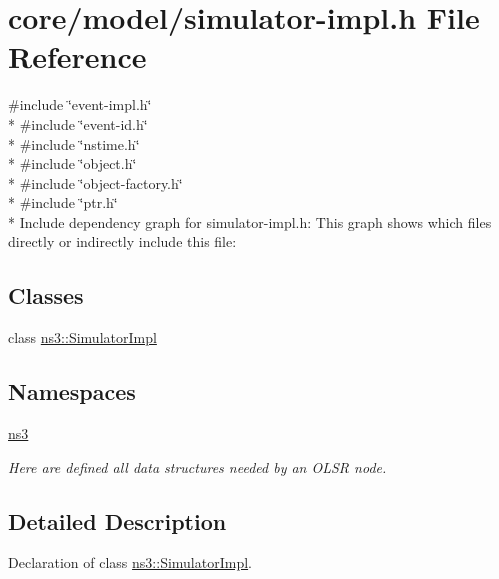 \hypertarget{simulator-impl_8h}{}\section{core/model/simulator-\/impl.h File Reference}
\label{simulator-impl_8h}
{\ttfamily \#include \char`\"{}event-\/impl.\+h\char`\"{}}\\*
{\ttfamily \#include \char`\"{}event-\/id.\+h\char`\"{}}\\*
{\ttfamily \#include \char`\"{}nstime.\+h\char`\"{}}\\*
{\ttfamily \#include \char`\"{}object.\+h\char`\"{}}\\*
{\ttfamily \#include \char`\"{}object-\/factory.\+h\char`\"{}}\\*
{\ttfamily \#include \char`\"{}ptr.\+h\char`\"{}}\\*
Include dependency graph for simulator-\/impl.h\+:
This graph shows which files directly or indirectly include this file\+:
\subsection*{Classes}
\begin{DoxyCompactItemize}
\item 
class \hyperlink{classns3_1_1SimulatorImpl}{ns3\+::\+Simulator\+Impl}
\end{DoxyCompactItemize}
\subsection*{Namespaces}
\begin{DoxyCompactItemize}
\item 
 \hyperlink{namespacens3}{ns3}
\begin{DoxyCompactList}\small\item\em Here are defined all data structures needed by an O\+L\+SR node. \end{DoxyCompactList}\end{DoxyCompactItemize}


\subsection{Detailed Description}
Declaration of class \hyperlink{classns3_1_1SimulatorImpl}{ns3\+::\+Simulator\+Impl}. 